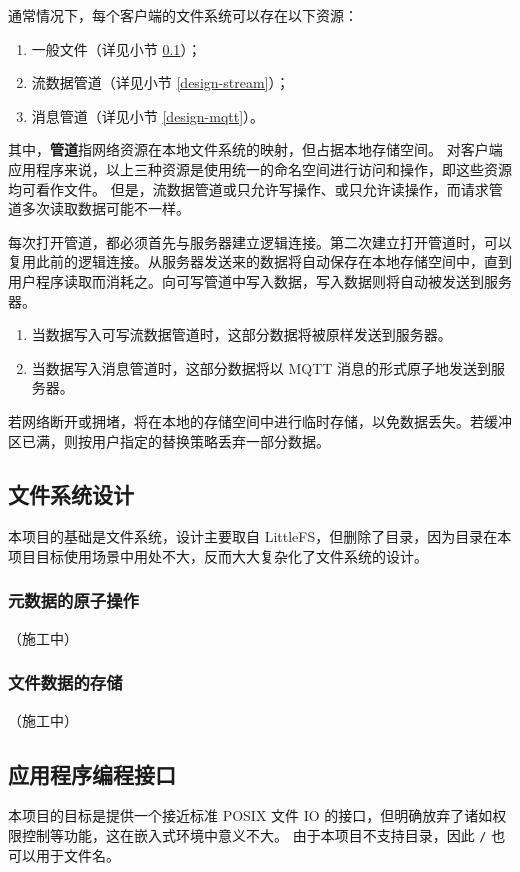 \documentclass{ctexart}
\begin{document}
通常情况下，每个客户端的文件系统可以存在以下资源：
\begin{enumerate}
	\item 一般文件（详见小节 \ref{design-fs}）；
	\item 流数据管道（详见小节 \ref{design-stream}）；
	\item 消息管道（详见小节 \ref{design-mqtt}）。
\end{enumerate}
其中，\textbf{管道}指网络资源在本地文件系统的映射，但占据本地存储空间。
对客户端应用程序来说，以上三种资源是使用统一的命名空间进行访问和操作，即这些资源均可看作文件。
但是，流数据管道或只允许写操作、或只允许读操作，而请求管道多次读取数据可能不一样。

每次打开管道，都必须首先与服务器建立逻辑连接。第二次建立打开管道时，可以复用此前的逻辑连接。从服务器发送来的数据将自动保存在本地存储空间中，直到用户程序读取而消耗之。向可写管道中写入数据，写入数据则将自动被发送到服务器。
\begin{enumerate}
	\item 当数据写入可写流数据管道时，这部分数据将被原样发送到服务器。
	\item 当数据写入消息管道时，这部分数据将以 MQTT 消息的形式原子地发送到服务器。
\end{enumerate}
若网络断开或拥堵，将在本地的存储空间中进行临时存储，以免数据丢失。若缓冲区已满，则按用户指定的替换策略丢弃一部分数据。

\subsection{文件系统设计}
\label{design-fs}
本项目的基础是文件系统，设计主要取自 LittleFS，但删除了目录，因为目录在本项目目标使用场景中用处不大，反而大大复杂化了文件系统的设计。

\subsubsection{元数据的原子操作}
（施工中）

\subsubsection{文件数据的存储}
（施工中）

\subsection{应用程序编程接口}
\label{design-api}
本项目的目标是提供一个接近标准 POSIX 文件 IO 的接口，但明确放弃了诸如权限控制等功能，这在嵌入式环境中意义不大。
由于本项目不支持目录，因此 \verb|/| 也可以用于文件名。
\end{document}
